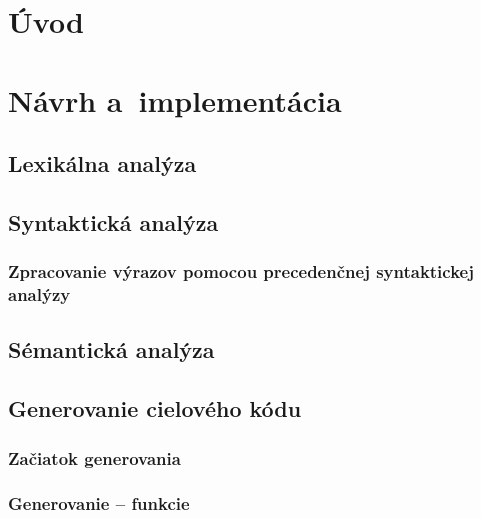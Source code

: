 \documentclass[a4paper, 11pt]{article}
\begin{document}
    \setcounter{page}{1}

    \section{Úvod}





    \section{Návrh a~implementácia}




    \subsection{Lexikálna analýza}




    \subsection{Syntaktická analýza}



    \subsubsection{Zpracovanie výrazov pomocou precedenčnej syntaktickej analýzy}




    \subsection{Sémantická analýza}




    \subsection{Generovanie cielového kódu}


    \subsubsection{Začiatok generovania}


    \subsubsection{Generovanie -- funkcie}
\end{document}
